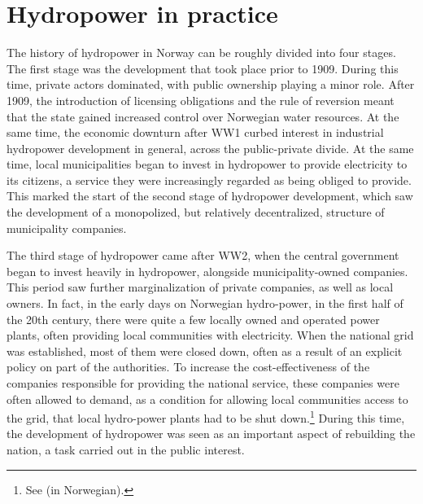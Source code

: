 %
%
%
%
%
%

\section{Hydropower in practice}

The history of hydropower in Norway can be roughly divided into four stages. The first stage was the development that took place prior to 1909. During this time, private actors dominated, with public ownership playing a minor role. After 1909, the introduction of licensing obligations and the rule of reversion meant that the state gained increased control over Norwegian water resources. At the same time, the economic downturn after WW1 curbed interest in industrial hydropower development in general, across the public-private divide. At the same time, local municipalities began to invest in hydropower to provide electricity to its citizens, a service they were increasingly regarded as being obliged to provide. This marked the start of the second stage of hydropower development, which saw the development of a monopolized, but relatively decentralized, structure of municipality companies.

The third stage of hydropower came after WW2, when the central government began to invest heavily in hydropower, alongside municipality-owned companies. This period saw further marginalization of private companies, as well as local owners. In fact, in the early days on Norwegian hydro-power, in the first half of the 20th century, there were quite a few locally owned and operated power plants, often providing local communities with electricity. When the national grid was established, most of them were closed down, often as a result of an explicit policy on part of the authorities. To increase the cost-effectiveness of the companies responsible for providing the national service, these companies were often allowed to demand, as a condition for allowing local communities access to the grid, that local hydro-power plants had to be shut down.\footnote{See \cite[p.111]{Hindrum} (in Norwegian).} During this time, the development of hydropower was seen as an important aspect of rebuilding the nation, a task carried out in the public interest. 

